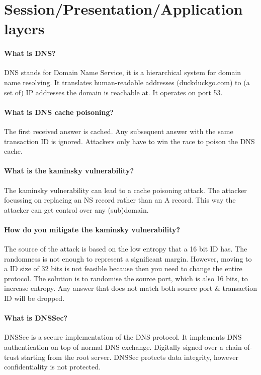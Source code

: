 \section{Session/Presentation/Application layers}
\paragraph{What is DNS?}
DNS stands for Domain Name Service, it is a hierarchical system for domain name resolving. It translates human-readable addresses (duckduckgo.com) to (a set of) IP addresses the domain is reachable at. It operates on port 53.

\paragraph{What is DNS cache poisoning?}
The first received answer is cached. Any subsequent answer with the same transaction ID is ignored. Attackers only have to win the race to poison the DNS cache.

\paragraph{What is the kaminsky vulnerability?}
The kaminsky vulnerability can lead to a cache poisoning attack. The attacker focussing on replacing an NS record rather than an A record. This way the attacker can get control over any (sub)domain.

\paragraph{How do you mitigate the kaminsky vulnerability?}
The source of the attack is based on the low entropy that a 16 bit ID has. The randomness is not enough to represent a significant margin. However, moving to a ID size of 32 bits is not feasible because then you need to change the entire protocol. The solution is to randomise the source port, which is also 16 bits, to increase entropy. Any answer that does not match both source port \& transaction ID will be dropped.

\paragraph{What is DNSSec?}
DNSSec is a secure implementation of the DNS protocol. It implements DNS authentication on top of normal DNS exchange. Digitally signed over a chain-of-trust starting from the root server. DNSSec protects data integrity, however confidentiality is not protected.

